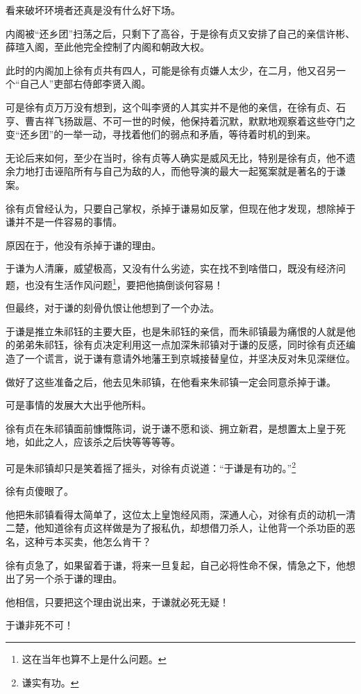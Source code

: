 \begin{multicols}{\theparacolNo}
		看来破坏环境者还真是没有什么好下场。

		内阁被“还乡团”扫荡之后，只剩下了高谷，于是徐有贞又安排了自己的亲信许彬、薛瑄入阁，至此他完全控制了内阁和朝政大权。

		此时的内阁加上徐有贞共有四人，可能是徐有贞嫌人太少，在二月，他又召另一个“自己人”吏部右侍郎李贤入阁。

		可是徐有贞万万没有想到，这个叫李贤的人其实并不是他的亲信，在徐有贞、石亨、曹吉祥飞扬跋扈、不可一世的时候，他保持着沉默，默默地观察着这些夺门之变“还乡团”的一举一动，寻找着他们的弱点和矛盾，等待着时机的到来。

		无论后来如何，至少在当时，徐有贞等人确实是威风无比，特别是徐有贞，他不遗余力地打击诬陷所有与自己为敌的人，而他导演的最大一起冤案就是著名的于谦案。

		徐有贞曾经认为，只要自己掌权，杀掉于谦易如反掌，但现在他才发现，想除掉于谦并不是一件容易的事情。

		原因在于，他没有杀掉于谦的理由。

		于谦为人清廉，威望极高，又没有什么劣迹，实在找不到啥借口，既没有经济问题，也没有生活作风问题\footnote{这在当年也算不上是什么问题。}，要把他搞倒谈何容易！

		但最终，对于谦的刻骨仇恨让他想到了一个办法。

		于谦是推立朱祁钰的主要大臣，也是朱祁钰的亲信，而朱祁镇最为痛恨的人就是他的弟弟朱祁钰，徐有贞决定利用这一点加深朱祁镇对于谦的反感，同时徐有贞还编造了一个谎言，说于谦有意请外地藩王到京城接替皇位，并坚决反对朱见深继位。

		做好了这些准备之后，他去见朱祁镇，在他看来朱祁镇一定会同意杀掉于谦。

		可是事情的发展大大出乎他所料。

		徐有贞在朱祁镇面前慷慨陈词，说于谦不愿和谈、拥立新君，是想置太上皇于死地，如此之人，应该杀之后快等等等等。

		可是朱祁镇却只是笑着摇了摇头，对徐有贞说道：“于谦是有功的。”\footnote{谦实有功。}

		徐有贞傻眼了。

		他把朱祁镇看得太简单了，这位太上皇饱经风雨，深通人心，对徐有贞的动机一清二楚，他知道徐有贞这样做是为了报私仇，却想借刀杀人，让他背一个杀功臣的恶名，这种亏本买卖，他怎么肯干？

		徐有贞急了，如果留着于谦，将来一旦复起，自己必将性命不保，情急之下，他想出了另一个杀于谦的理由。

		他相信，只要把这个理由说出来，于谦就必死无疑！

		于谦非死不可！


\end{multicols}
